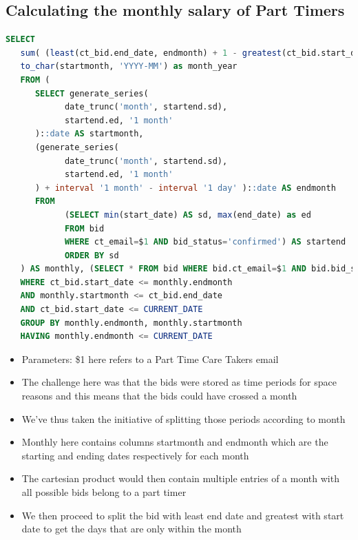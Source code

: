 \documentclass[
  paper=a4,
  ,captions=tableheading
]{scrartcl}
\providecommand{\tightlist}{%
  \setlength{\itemsep}{0pt}\setlength{\parskip}{0pt}}
\begin{document}
\hypertarget{calculating-the-monthly-salary-of-part-timers}{%
\subsection{Calculating the monthly salary of Part
Timers}\label{calculating-the-monthly-salary-of-part-timers}}

\begin{lstlisting}[language=SQL]
SELECT
   sum( (least(ct_bid.end_date, endmonth) + 1 - greatest(ct_bid.start_date, startmonth)) * ct_price) * 0.75 as full_pay,
   to_char(startmonth, 'YYYY-MM') as month_year
   FROM (
      SELECT generate_series(
            date_trunc('month', startend.sd),
            startend.ed, '1 month'
      )::date AS startmonth,
      (generate_series(
            date_trunc('month', startend.sd),
            startend.ed, '1 month'
      ) + interval '1 month' - interval '1 day' )::date AS endmonth
      FROM
            (SELECT min(start_date) AS sd, max(end_date) as ed
            FROM bid
            WHERE ct_email=$1 AND bid_status='confirmed') AS startend
            ORDER BY sd
   ) AS monthly, (SELECT * FROM bid WHERE bid.ct_email=$1 AND bid.bid_status='confirmed') as ct_bid
   WHERE ct_bid.start_date <= monthly.endmonth
   AND monthly.startmonth <= ct_bid.end_date
   AND ct_bid.start_date <= CURRENT_DATE
   GROUP BY monthly.endmonth, monthly.startmonth
   HAVING monthly.endmonth <= CURRENT_DATE
\end{lstlisting}

\begin{itemize}
\tightlist
\item
  Parameters: \$1 here refers to a Part Time Care Takers email
\item
  The challenge here was that the bids were stored as time periods for
  space reasons and this means that the bids could have crossed a month
\item
  We've thus taken the initiative of splitting those periods according
  to month
\item
  Monthly here contains columns startmonth and endmonth which are the
  starting and ending dates respectively for each month
\item
  The cartesian product would then contain multiple entries of a month
  with all possible bids belong to a part timer
\item
  We then proceed to split the bid with least end date and greatest with
  start date to get the days that are only within the month
\end{itemize}
\end{document}

